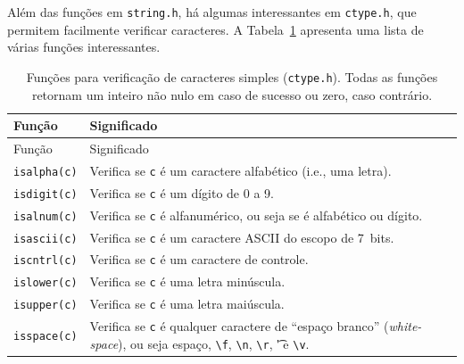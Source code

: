 \documentclass[
  11pt,
  a4paper,
]{scrbook}
\begin{document}
Além das funções em \texttt{string.h}, há algumas interessantes em
\texttt{ctype.h}, que permitem facilmente verificar caracteres. A
Tabela~\ref{tbl-funcoes-para-caractere} apresenta uma lista de várias
funções interessantes.

\begin{longtable}[]{@{}
  >{\centering\arraybackslash}p{}
  >{\raggedright\arraybackslash}p{}@{}}
\caption{Funções para verificação de caracteres simples
(\texttt{ctype.h}). Todas as funções retornam um inteiro não nulo em
caso de sucesso ou zero, caso
contrário.}\label{tbl-funcoes-para-caractere}\tabularnewline
\toprule\noalign{}
\begin{minipage}[b]{\linewidth}\centering
Função
\end{minipage} & \begin{minipage}[b]{\linewidth}\raggedright
Significado
\end{minipage} \\
\midrule\noalign{}
\endfirsthead
\toprule\noalign{}
\begin{minipage}[b]{\linewidth}\centering
Função
\end{minipage} & \begin{minipage}[b]{\linewidth}\raggedright
Significado
\end{minipage} \\
\midrule\noalign{}
\endhead
\bottomrule\noalign{}
\endlastfoot
\texttt{isalpha(c)} & Verifica se \texttt{c} é um caractere alfabético
(i.e., uma letra). \\
\texttt{isdigit(c)} & Verifica se \texttt{c} é um dígito de 0 a 9. \\
\texttt{isalnum(c)} & Verifica se \texttt{c} é alfanumérico, ou seja se
é alfabético ou dígito. \\
\texttt{isascii(c)} & Verifica se \texttt{c} é um caractere ASCII do
escopo de 7~bits. \\
\texttt{iscntrl(c)} & Verifica se \texttt{c} é um caractere de
controle. \\
\texttt{islower(c)} & Verifica se \texttt{c} é uma letra minúscula. \\
\texttt{isupper(c)} & Verifica se \texttt{c} é uma letra maiúscula. \\
\texttt{isspace(c)} & Verifica se \texttt{c} é qualquer caractere de
``espaço branco'' (\emph{white-space}), ou seja espaço,
\texttt{\textbackslash{}f}, \texttt{\textbackslash{}n},
\texttt{\textbackslash{}r}, \t' e \texttt{\textbackslash{}v}. \\

\end{longtable}
\end{document}
